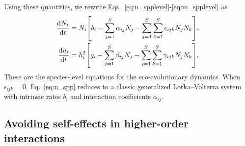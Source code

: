 \documentclass[10pt]{article}
\newcommand{\ud}{\text{d}}
\let\originalleft\left
\let\originalright\right
\renewcommand{\left}{\mathopen{}\mathclose\bgroup\originalleft}
\renewcommand{\right}{\aftergroup\egroup\originalright}
\begin{document}
Using these quantities, we rewrite Eqs.~\ref{eq:n_spplevel}-\ref{eq:m_spplevel} as
\begin{align}
  \label{eq:n_spp}
  \frac{\ud N_i}{\ud t}
  &= N_i \left[ b_i
  - \sum_{j=1}^S \alpha_{ij} N_j
  - \sum_{j=1}^S \sum_{k=1}^S \epsilon_{ijk} N_j N_k \right] ,
  \\
  \label{eq:m_spp}
  \frac{\ud u_i}{\ud t}
  &= h_i^2 \left[ g_i
  - \sum_{j=1}^S \beta_{ij} N_j
  - \sum_{j=1}^S \sum_{k=1}^S \gamma_{ijk} N_j N_k \right] .
\end{align}
These are the species-level equations for the eco-evolutionary dynamics. When $\epsilon_{ijk} = 0$, Eq.~\ref{eq:n_spp} reduces to a classic generalized Lotka--Volterra system with intrinsic rates $b_i$ and interaction coefficients $\alpha_{ij}$.

\subsection{Avoiding self-effects in higher-order interactions} \label{sec:noself}
\end{document}
